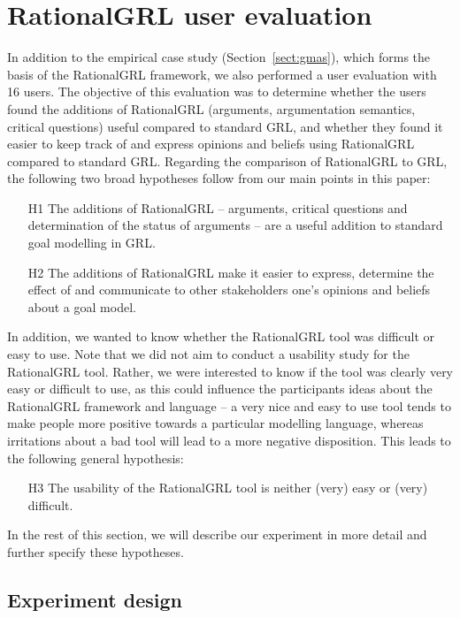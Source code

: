 \section{RationalGRL user evaluation}
\label{sect:validation}

In addition to the empirical case study (Section~\ref{sect:gmas}), which forms the basis of the RationalGRL framework, we also performed a user evaluation with 16 users. The objective of this evaluation was to determine whether the users found the additions of RationalGRL (arguments, argumentation semantics, critical questions) useful compared to standard GRL, and whether they found it easier to keep track of and express opinions and beliefs using RationalGRL compared to standard GRL. Regarding the comparison of RationalGRL to GRL, the following two broad hypotheses follow from our main points in this paper:

\begin{itemize}
\item[H1] The additions of RationalGRL -- arguments, critical questions and determination of the status of arguments -- are a useful addition to standard goal modelling in GRL.
\item[H2] The additions of RationalGRL make it easier to express, determine the effect of and communicate to other stakeholders one's opinions and beliefs about a goal model.
\end{itemize}

In addition, we wanted to know whether the RationalGRL tool was difficult or easy to use. Note that we did not aim to conduct a usability study for the RationalGRL tool. Rather, we were interested to know if the tool was clearly very easy or difficult to use, as this could influence the participants ideas about the RationalGRL framework and language -- a very nice and easy to use tool tends to make people more positive towards a particular modelling language, whereas irritations about a bad tool will lead to a more negative disposition. This leads to the following general hypothesis:

\begin{itemize}
\item[H3] The usability of the RationalGRL tool is neither (very) easy or (very) difficult. 
\end{itemize}

In the rest of this section, we will describe our experiment in more detail and further specify these hypotheses.

\subsection{Experiment design}

